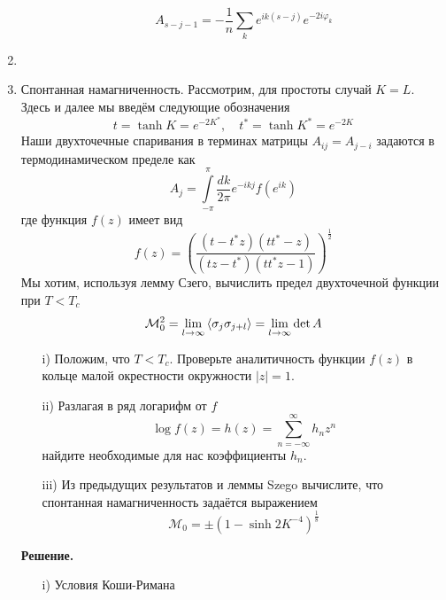 \documentclass[12pt]{article}
\theoremstyle{definition}
\begin{document}
\begin{enumerate}
\begin{itemize}
\begin{equation}
            \boxed{A_{s-j-1}=-\frac{1}{n}\sum\limits_ke^{ik(s-j)}e^{-2i\varphi_k}}
        \end{equation}
    \end{itemize}
    \item
    \item Спонтанная намагниченность. Рассмотрим, для простоты случай $K=L$. Здесь и далее мы введём следующие обозначения
    \begin{equation}
        t=\tanh K=e^{-2K^*},\quad t^*=\tanh K^*=e^{-2K}
    \end{equation}
    Наши двухточечные спаривания в терминах матрицы $A_{ij}=A_{j-i}$ задаются в термодинамическом пределе как
    \begin{equation}
        A_j=\int\limits_{-\pi}^\pi\frac{dk}{2\pi}e^{-ikj}f(e^{ik})
    \end{equation}
    где функция $f(z)$ имеет вид
    \begin{equation}
        f(z)=\left(\frac{(t-t^*z)(tt^*-z)}{(tz-t^*)(tt^*z-1)}\right)^\frac{1}{2}
    \end{equation}
    Мы хотим, используя лемму Сзего, вычислить предел двухточечной функции при $T<T_c$
    \begin{equation}
        \mathcal{M}_0^2=\lim\limits_{l\rightarrow\infty}\braket{\sigma_j\sigma_{j+l}}=\lim\limits_{l\rightarrow\infty}\det A
    \end{equation}
    \begin{itemize}
        \item[i)] Положим, что $T<T_c$. Проверьте аналитичность функции $f(z)$ в кольце малой окрестности окружности $|z|=1$.
        \item[ii)] Разлагая в ряд логарифм от $f$
        \begin{equation}
            \log f(z)=h(z)=\sum\limits_{n=-\infty}^\infty h_nz^n
        \end{equation}
        найдите необходимые для нас коэффициенты $h_n$.
        \item[iii)] Из предыдущих результатов и леммы Szego вычислите, что спонтанная намагниченность задаётся выражением
        \begin{equation}
            \mathcal{M}_0=\pm(1-\sinh2K^{-4})^\frac{1}{8}
        \end{equation}
    \end{itemize}
    \textbf{Решение.}
    \begin{itemize}
        \item[i)] Условия Коши-Римана
        \begin{equation}

\end{equation}
\end{itemize}
\end{enumerate}
\end{document}
